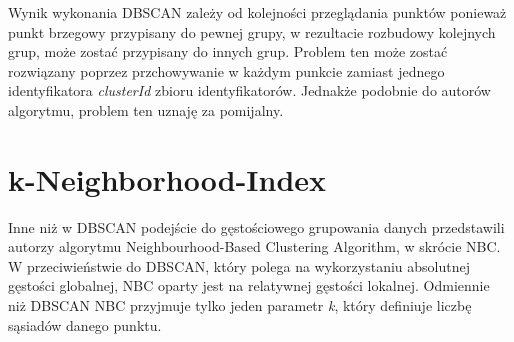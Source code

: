 Wynik wykonania DBSCAN zależy od kolejności przeglądania punktów ponieważ punkt brzegowy przypisany do pewnej grupy, w rezultacie rozbudowy kolejnych grup, może zostać przypisany do innych grup. Problem ten może zostać rozwiązany poprzez przchowywanie w każdym punkcie zamiast jednego identyfikatora \emph{clusterId} zbioru identyfikatorów. Jednakże podobnie do autorów algorytmu, problem ten uznaję za pomijalny.

\section[k-Neighborhood-Index][k-Neighborhood-Index]{k-Neighborhood-Index}
Inne niż w DBSCAN podejście do gęstościowego grupowania danych przedstawili autorzy algorytmu Neighbourhood-Based Clustering Algorithm, w skrócie NBC. W przeciwieństwie do DBSCAN, który polega na wykorzystaniu absolutnej gęstości globalnej, NBC oparty jest na relatywnej gęstości lokalnej. Odmiennie niż DBSCAN NBC przyjmuje tylko jeden parametr \emph{k}, który definiuje liczbę sąsiadów danego punktu.